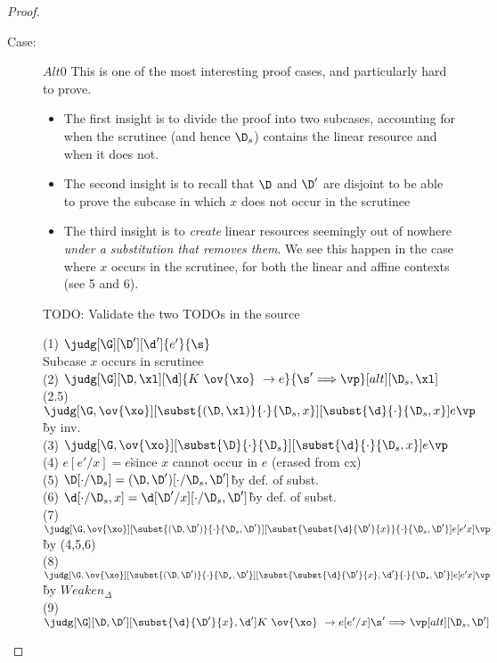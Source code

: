 \begin{proof}
\begin{description}
\item[Case:] $Alt0$
    This is one of the most interesting proof cases, and particularly hard to prove.
        \begin{itemize}
            \item The first insight is to divide the proof into two subcases, accounting
                for when the scrutinee (and hence $\D_s$) contains the linear resource and when it does not.
            \item The second insight is to recall that $\D$ and $\D'$ are
                disjoint to be able to prove the subcase in which $x$ does not
                occur in the scrutinee
            \item The third insight is to \emph{create} linear resources
                seemingly out of nowhere \emph{under a substitution that
                removes them}. We see this happen in the case where $x$ occurs
                in the scrutinee, for both the linear and affine contexts (see 5 and 6).
        \end{itemize}
        TODO: Validate the two TODOs in the source
\begin{tabbing}
  (1) $\judg[\G][\D'][\d']{e'}{\s}$\\
  Subcase $x$ occurs in scrutinee\\
    (2) $\judg[\G][\D,\xl][\d]{K~\ov{\xo}~\to e}{\s' \Longrightarrow \vp}[alt][\D_s,\xl]$\\
    (2.5) $\judg[\G,\ov{\xo}][\subst{(\D,\xl)}{\cdot}{\D_s,x}][\subst{\d}{\cdot}{\D_s,x}]{e}{\vp}$\`by inv.\\
    (3) $\judg[\G,\ov{\xo}][\subst{\D}{\cdot}{\D_s}][\subst{\d}{\cdot}{\D_s,x}]{e}{\vp}$\\
    (4) $e[e'/x] = e$\` since $x$ cannot occur in $e$ (erased from cx)\\
    (5) $\D[\cdot/\D_s] = (\D,\D')[\cdot/\D_s,\D']$\`by def. of subst.\\
    (6) $\d[\cdot/\D_s,x] = \d[\D'/x][\cdot/\D_s,\D']$\` by def. of subst.\\
    (7) $\judg[\G,\ov{\xo}][\subst{(\D,\D')}{\cdot}{\D_s,\D'}][\subst{\subst{\d}{\D'}{x}}{\cdot}{\D_s,\D'}]{e[e'x]}{\vp}$\` by (4,5,6)\\
    (8) $\judg[\G,\ov{\xo}][\subst{(\D,\D')}{\cdot}{\D_s,\D'}][\subst{\subst{\d}{\D'}{x},\d'}{\cdot}{\D_s,\D'}]{e[e'x]}{\vp}$\` by $Weaken_\Delta$\\ %
    (9) $\judg[\G][\D,\D'][\subst{\d}{\D'}{x},\d']{K~\ov{\xo}~\to e[e'/x]}{\s' \Longrightarrow \vp}[alt][\D_s,\D']$\\

\end{tabbing}
\end{description}
\end{proof}
